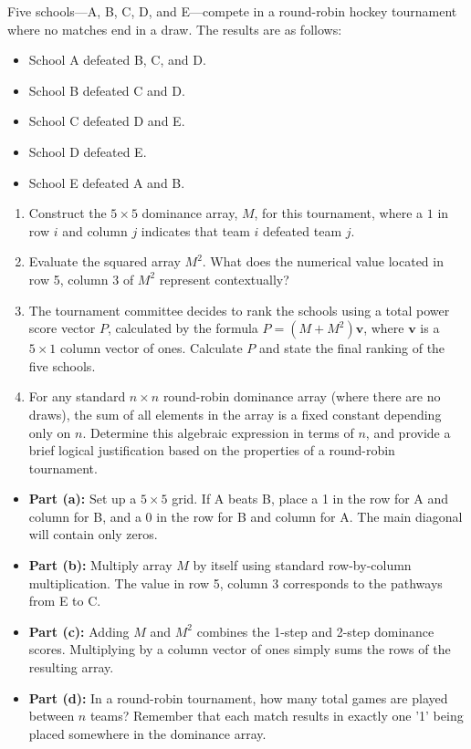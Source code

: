 \begin{problem}
Five schools—A, B, C, D, and E—compete in a round-robin hockey tournament where no matches end in a draw. The results are as follows:
\begin{itemize}
    \item School A defeated B, C, and D.
    \item School B defeated C and D.
    \item School C defeated D and E.
    \item School D defeated E.
    \item School E defeated A and B.
\end{itemize}

\begin{enumerate}[label=\textbf{(\alph*)}]
    \item Construct the $5 \times 5$ dominance array, $M$, for this tournament, where a $1$ in row $i$ and column $j$ indicates that team $i$ defeated team $j$.
    \item Evaluate the squared array $M^2$. What does the numerical value located in row 5, column 3 of $M^2$ represent contextually?
    \item The tournament committee decides to rank the schools using a total power score vector $P$, calculated by the formula $P = (M + M^2)\mathbf{v}$, where $\mathbf{v}$ is a $5 \times 1$ column vector of ones. Calculate $P$ and state the final ranking of the five schools.
    \item For any standard $n \times n$ round-robin dominance array (where there are no draws), the sum of all elements in the array is a fixed constant depending only on $n$. Determine this algebraic expression in terms of $n$, and provide a brief logical justification based on the properties of a round-robin tournament.
\end{enumerate}
\end{problem}

\begin{hint}
\begin{itemize}
    \item \textbf{Part (a):} Set up a $5 \times 5$ grid. If A beats B, place a 1 in the row for A and column for B, and a 0 in the row for B and column for A. The main diagonal will contain only zeros.
    \item \textbf{Part (b):} Multiply array $M$ by itself using standard row-by-column multiplication. The value in row 5, column 3 corresponds to the pathways from E to C.
    \item \textbf{Part (c):} Adding $M$ and $M^2$ combines the 1-step and 2-step dominance scores. Multiplying by a column vector of ones simply sums the rows of the resulting array.
    \item \textbf{Part (d):} In a round-robin tournament, how many total games are played between $n$ teams? Remember that each match results in exactly one '1' being placed somewhere in the dominance array.
\end{itemize}
\end{hint}

